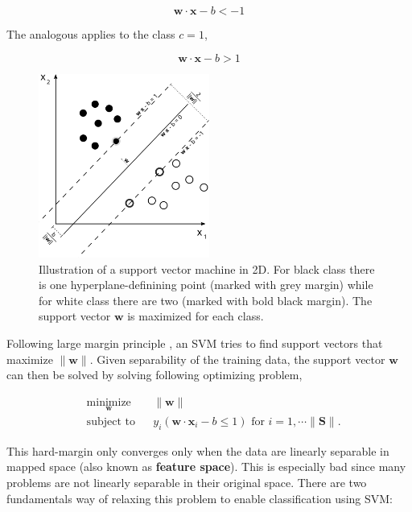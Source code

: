 \documentclass[pdftex,12pt,a4paper]{report}
\begin{document}
\begin{equation}
\mathbf{w} \cdot \mathbf{x} - b < -1
\label{equation:svm_class_1}
\end{equation}

The analogous applies to the class $c = 1$,

\begin{equation}
\mathbf{w} \cdot \mathbf{x} - b > 1
\label{equation:svm_class_2}
\end{equation}

\begin{figure}[H]
\centering
\includegraphics[width=0.5\textwidth]{images/svm}
\caption[Illustration of SVM in 2D]{Illustration of a support vector machine in 2D. For black class there is one hyperplane-definining point (marked with grey margin) while for white class there are two (marked with bold black margin). The support vector $\mathbf{w}$ is maximized for each class.}
\label{fig:svm}
\end{figure}

Following large margin principle \cite{vapnik1964note, murphy2012machine}, an SVM tries to find support vectors that maximize $\| \mathbf{w} \|$. Given separability of the training data, the support vector $\mathbf{w}$ can then be solved by solving following optimizing problem, 

\begin{equation*}
\begin{aligned}
& \underset{\mathbf{
w}}{\text{minimize}}
& & \| \mathbf{w}\| \\
& \text{subject to}
& & y_i(\mathbf{w} \cdot \mathbf{x}_i - b \leq 1) \text{ for } i = 1, \cdots \| \mathbf{S} \|.
\end{aligned}
\label{eq:svm_hard_margin}
\end{equation*}

This hard-margin only converges only when the data are linearly separable in mapped space (also known as \textbf{feature space}). This is especially bad since many problems are not linearly separable in their original space. There are two fundamentals way of relaxing this problem to enable classification using SVM:
\end{document}
